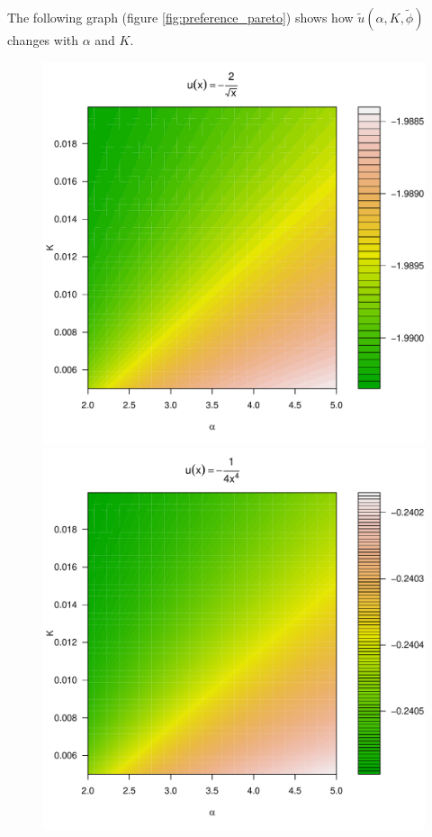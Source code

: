 \documentclass[11pt,a4]{amsart}
\newcommand{\wt}{\widetilde}
\newcommand{\1}{{\mathbf 1}}
\begin{document}
The following graph (figure \ref{fig:preference_pareto}) shows how
$\tilde u(\alpha, K, \wt\phi)$ changes with $\alpha$ and $K$.
\begin{figure}[htb!]
  \begin{minipage}{0.5\linewidth}
    \includegraphics[width=\textwidth]{preference_pareto5e-1_A.pdf}
  \end{minipage}\hfill
  \begin{minipage}{0.5\linewidth}
    \includegraphics[width=\textwidth]{preference_pareto4_A.pdf}

\end{minipage}
\end{figure}
\end{document}
